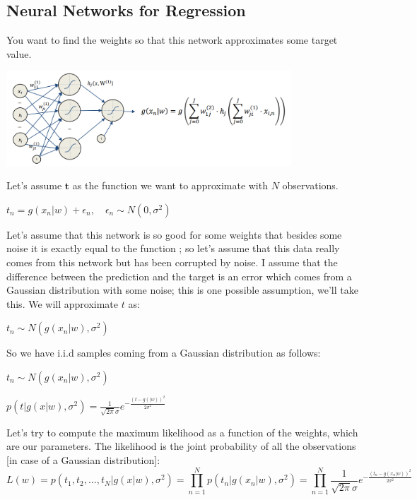 \subsection{Neural Networks for Regression}
You want to find the weights so that this network approximates some target value.
\begin{center}
    \includegraphics[width=0.8\textwidth]{images_1/per6.png}    
\end{center}
Let's assume $\textbf{t}$ as the function we want to approximate with $N$ observations.
\begin{center}
    $t_{n}=g\left(x_{n} | w\right)+\epsilon_{n}, \quad \epsilon_{n} \sim N\left(0, \sigma^{2}\right)$ 
\end{center}
Let's assume that this network is so good for some weights that besides some noise it is exactly equal to the function 
; so let's assume that this data really comes from this network but has been corrupted by noise. I assume that the difference between the prediction and the target is an error which comes from a Gaussian distribution with some noise; this is one possible assumption, we'll take this. We will approximate $t$ as:
\begin{center}
    $t_n \sim N(g(x_n|w),\sigma^2)$
\end{center}
So we have i.i.d samples coming from a Gaussian distribution as follows:
\begin{center}
    $t_n \sim N(g(x_n|w),\sigma^2)$
    
    $p(t|g(x|w),\sigma^2)=\frac{1}{\sqrt{2\pi}\sigma}e^{-\frac{(t-g(|w))^2}{2\sigma^2}}$
\end{center}
Let's try to compute the maximum likelihood %
as a function of the weights, which are our parameters. The likelihood is the joint probability of all the observations [in case of a Gaussian distribution]: 
$$
L(w)=p(t_1, t_2, ..., t_N | g(x|w), \sigma^2)=\prod_{n=1}^{N} p\left(t_{n} |g\left(x_{n} | w\right), \sigma^{2}\right)=
\prod_{n=1}^{N} \frac{1}{\sqrt{2 \pi} \sigma} e^{-\frac{\left(t_{n}-g\left(x_{n} | w\right)\right)^{2}}{2 \sigma^{2}}}
$$
